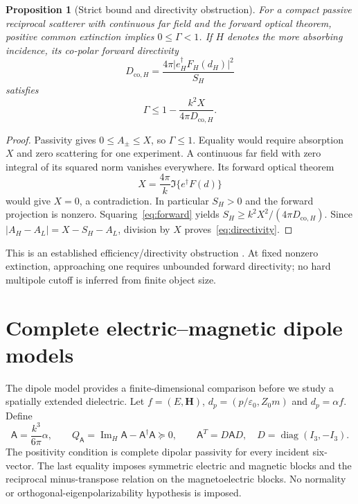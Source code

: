 \documentclass[11pt,a4paper]{article}
\newtheorem{proposition}[theorem]{Proposition}
\theoremstyle{remark}
\newcommand{\abs}[1]{\lvert #1\rvert}
\newcommand{\ImH}{\operatorname{Im}_{H}}
\newcommand{\diag}{\operatorname{diag}}
\begin{document}
\begin{proposition}[Strict bound and directivity obstruction]\label{prop:strict}
For a compact passive reciprocal scatterer with continuous far field and the forward optical theorem, positive common extinction implies $0\leq\Gamma<1$. If $H$ denotes the more absorbing incidence, its co-polar forward directivity
\[
 D_{\mathrm{co},H}=\frac{4\pi\abs{e_H^\dagger F_H(d_H)}^2}{S_H}
\]
satisfies
\begin{equation}\label{eq:directivity}
 \Gamma\leq1-\frac{k^2X}{4\pi D_{\mathrm{co},H}}.
\end{equation}
\end{proposition}
\begin{proof}
Passivity gives $0\leq A_\pm\leq X$, so $\Gamma\leq1$. Equality would require absorption $X$ and zero scattering for one experiment. A continuous far field with zero integral of its squared norm vanishes everywhere. Its forward optical theorem
\begin{equation}\label{eq:forward}
 X=\frac{4\pi}k\Im\{e^\dagger F(d)\}
\end{equation}
would give $X=0$, a contradiction. In particular $S_H>0$ and the forward projection is nonzero. Squaring~\eqref{eq:forward} yields $S_H\geq k^2X^2/(4\pi D_{\mathrm{co},H})$. Since $\abs{A_H-A_L}=X-S_H-A_L$, division by $X$ proves~\eqref{eq:directivity}.
\end{proof}
This is an established efficiency/directivity obstruction \citep{Andersen2005,Liberal2014}. At fixed nonzero extinction, approaching one requires unbounded forward directivity; no hard multipole cutoff is inferred from finite object size.

\section{Complete electric--magnetic dipole models}\label{sec:dipole}
The dipole model provides a finite-dimensional comparison before we study a spatially extended dielectric. Let $f=(E,\mathbf H)$, $d_p=(p/\varepsilon_0,Z_0m)$ and $d_p=\alpha f$. Define
\begin{equation}\label{eq:dipole-model}
 \mathsf A=\frac{k^3}{6\pi}\alpha,\qquad
 Q_{\mathsf A}=\ImH\mathsf A-\mathsf A^\dagger\mathsf A\succeq0,
 \qquad \mathsf A^T=D\mathsf A D,\quad D=\diag(I_3,-I_3).
\end{equation}
The positivity condition is complete dipolar passivity for every incident six-vector. The last equality imposes symmetric electric and magnetic blocks and the reciprocal minus-transpose relation on the magnetoelectric blocks. No normality or orthogonal-eigenpolarizability hypothesis is imposed.
\end{document}
